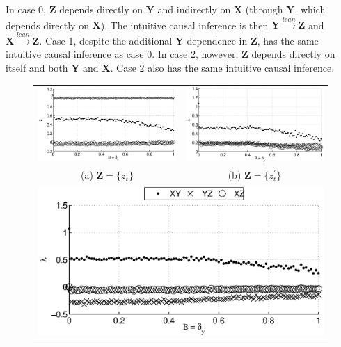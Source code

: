 \documentclass[a4paper,11pt,twocolumn]{article}
\begin{document}
In case 0, $\mathbf{Z}$ depends directly on $\mathbf{Y}$ and indirectly on $\mathbf{X}$ (through $\mathbf{Y}$, which depends directly on $\mathbf{X}$).  The intuitive causal inference is then $\mathbf{Y}\xrightarrow{lean}\mathbf{Z}$ and $\mathbf{X}\xrightarrow{lean}\mathbf{Z}$.  Case 1, despite the additional $\mathbf{Y}$ dependence in $\mathbf{Z}$, has the same intuitive causal inference as case 0.  In case 2, however, $\mathbf{Z}$ depends directly on itself and both $\mathbf{Y}$ and $\mathbf{X}$.  Case 2 also has the same intuitive causal inference.

\begin{figure}[ht]
\begin{tabular}{cc}
\includegraphics[scale=0.40]{XYZIRexample_Bxytol.eps} & \includegraphics[scale=0.40]{XYZIRexample_BxytolZXandY.eps} \\
(a) $\mathbf{Z} = \{z_t\}$ & (b) $\mathbf{Z} = \{z^\prime_t\}$ \\
\multicolumn{2}{c}{\includegraphics[scale=0.40]{XYZIRexample_BxytolZXandYandZ.eps}} \\

\end{tabular}
\end{figure}
\end{document}
